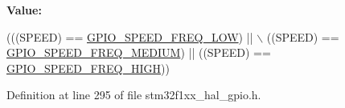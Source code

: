 {\bfseries Value\+:}
\begin{DoxyCode}
(((SPEED) == \hyperlink{group___g_p_i_o__speed__define_gab7916c4265bfa1b26a5205ea9c1caa4e}{GPIO\_SPEED\_FREQ\_LOW}) || \(\backslash\)
                              ((SPEED) == \hyperlink{group___g_p_i_o__speed__define_ga1724a25a9cf00ebf485daeb09cfa1e25}{GPIO\_SPEED\_FREQ\_MEDIUM}) || ((SPEED) == 
      \hyperlink{group___g_p_i_o__speed__define_gaef5898db71cdb957cd41f940b0087af8}{GPIO\_SPEED\_FREQ\_HIGH}))
\end{DoxyCode}


Definition at line 295 of file stm32f1xx\+\_\+hal\+\_\+gpio.\+h.

